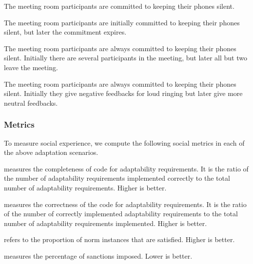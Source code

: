 \begin{description}[leftmargin=1em]
\item[Norms fixed.] 
The meeting room participants are committed to keeping their 
phones silent.

\item[Change in norms.] 
The meeting room participants are initially committed to keeping their
phones silent, but later the commitment expires. 

\item[Change in context.] 
The meeting room participants are always committed to keeping their
phones silent. Initially there are several participants in the meeting, but later
all but two leave the meeting.

\item[Change in sanction.] 
The meeting room participants are always committed to keeping their 
phones silent. Initially they give negative feedbacks for loud ringing
but later give more neutral feedbacks. 
\end{description}


\subsubsection*{Metrics}

To measure social experience, we compute the following social metrics
in each of the above adaptation scenarios. 
\begin{description}[leftmargin=1em] 
\item[Adaptability coverage] measures the completeness of code for
adaptability requirements. It is the ratio of the number of adaptability
requirements implemented correctly to the total number of adaptability
requirements. Higher is better.

\item[Adaptability correctness] measures the correctness of the code for
adaptability requirements. It is the ratio of the number of correctly 
implemented adaptability requirements to the total number of adaptability
requirements implemented. Higher is better.

\item[Norm compliance] refers to the proportion of norm instances that
are satisfied. Higher is better.

\item[Sanction proportion] measures the percentage of sanctions imposed.
Lower is better.
\end{description}


